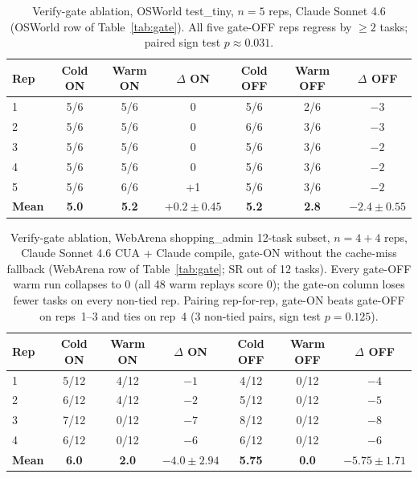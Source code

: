 \documentclass[11pt]{article}
\begin{document}
\begin{table}[h]
\centering
\caption{Verify-gate ablation, OSWorld test\_tiny, $n{=}5$ reps, Claude Sonnet 4.6 (OSWorld row of Table~\ref{tab:gate}). All five gate-OFF reps regress by $\geq 2$ tasks; paired sign test $p \approx 0.031$.}
\label{tab:gate-osworld}
\begin{tabular}{@{}lcccccc@{}}
\toprule
Rep & Cold ON & Warm ON & $\Delta$ ON & Cold OFF & Warm OFF & $\Delta$ OFF \\
\midrule
1 & 5/6 & 5/6 & 0 & 5/6 & 2/6 & $-3$ \\
2 & 5/6 & 5/6 & 0 & 6/6 & 3/6 & $-3$ \\
3 & 5/6 & 5/6 & 0 & 5/6 & 3/6 & $-2$ \\
4 & 5/6 & 5/6 & 0 & 5/6 & 3/6 & $-2$ \\
5 & 5/6 & 6/6 & +1 & 5/6 & 3/6 & $-2$ \\
\midrule
\textbf{Mean} & \textbf{5.0} & \textbf{5.2} & \textbf{$+0.2 \pm 0.45$} & \textbf{5.2} & \textbf{2.8} & \textbf{$-2.4 \pm 0.55$} \\
\bottomrule
\end{tabular}
\end{table}

\begin{table}[h]
\centering
\caption{Verify-gate ablation, WebArena shopping\_admin 12-task subset, $n{=}4{+}4$ reps, Claude Sonnet 4.6 CUA + Claude compile, gate-ON without the cache-miss fallback (WebArena row of Table~\ref{tab:gate}; SR out of 12 tasks). Every gate-OFF warm run collapses to $0$ (all 48 warm replays score $0$); the gate-on column loses fewer tasks on every non-tied rep. Pairing rep-for-rep, gate-ON beats gate-OFF on reps~1--3 and ties on rep~4 (3 non-tied pairs, sign test $p = 0.125$).}
\label{tab:gate-webarena}
\begin{tabular}{@{}lcccccc@{}}
\toprule
Rep & Cold ON & Warm ON & $\Delta$ ON & Cold OFF & Warm OFF & $\Delta$ OFF \\
\midrule
1 & 5/12 & 4/12 & $-1$ & 4/12 & 0/12 & $-4$ \\
2 & 6/12 & 4/12 & $-2$ & 5/12 & 0/12 & $-5$ \\
3 & 7/12 & 0/12 & $-7$ & 8/12 & 0/12 & $-8$ \\
4 & 6/12 & 0/12 & $-6$ & 6/12 & 0/12 & $-6$ \\
\midrule
\textbf{Mean} & \textbf{6.0} & \textbf{2.0} & \textbf{$-4.0 \pm 2.94$} & \textbf{5.75} & \textbf{0.0} & \textbf{$-5.75 \pm 1.71$} \\
\bottomrule
\end{tabular}
\end{table}
\end{document}
